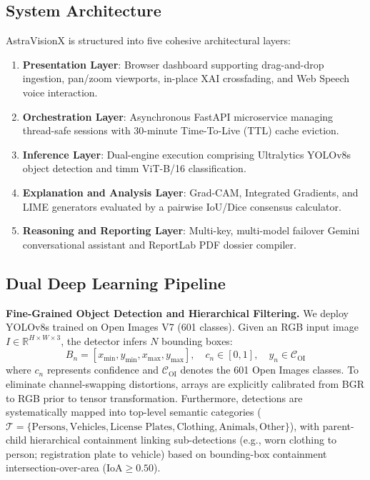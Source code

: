 \documentclass[journal,10pt,twocolumn]{IEEEtran}
\begin{document}
\subsection{System Architecture}
AstraVisionX is structured into five cohesive architectural layers:
\begin{enumerate}
    \item \textbf{Presentation Layer}: Browser dashboard supporting drag-and-drop ingestion, pan/zoom viewports, in-place XAI crossfading, and Web Speech voice interaction.
    \item \textbf{Orchestration Layer}: Asynchronous FastAPI microservice managing thread-safe sessions with 30-minute Time-To-Live (TTL) cache eviction.
    \item \textbf{Inference Layer}: Dual-engine execution comprising Ultralytics YOLOv8s object detection and timm ViT-B/16 classification.
    \item \textbf{Explanation and Analysis Layer}: Grad-CAM, Integrated Gradients, and LIME generators evaluated by a pairwise IoU/Dice consensus calculator.
    \item \textbf{Reasoning and Reporting Layer}: Multi-key, multi-model failover Gemini conversational assistant and ReportLab PDF dossier compiler.
\end{enumerate}

\subsection{Dual Deep Learning Pipeline}
\noindent\textbf{Fine-Grained Object Detection and Hierarchical Filtering.} We deploy YOLOv8s trained on Open Images V7 (601 classes). Given an RGB input image $I \in \mathbb{R}^{H \times W \times 3}$, the detector infers $N$ bounding boxes:
\begin{equation}
B_n = [x_{\min}, y_{\min}, x_{\max}, y_{\max}], \quad c_n \in [0, 1], \quad y_n \in \mathcal{C}_{\text{OI}}
\end{equation}
where $c_n$ represents confidence and $\mathcal{C}_{\text{OI}}$ denotes the 601 Open Images classes. To eliminate channel-swapping distortions, arrays are explicitly calibrated from BGR to RGB prior to tensor transformation. Furthermore, detections are systematically mapped into top-level semantic categories ($\mathcal{T} = \{\text{Persons}, \text{Vehicles}, \text{License Plates}, \text{Clothing}, \text{Animals}, \text{Other}\}$), with parent-child hierarchical containment linking sub-detections (e.g., worn clothing to person; registration plate to vehicle) based on bounding-box containment intersection-over-area ($\text{IoA} \ge 0.50$).
\end{document}
